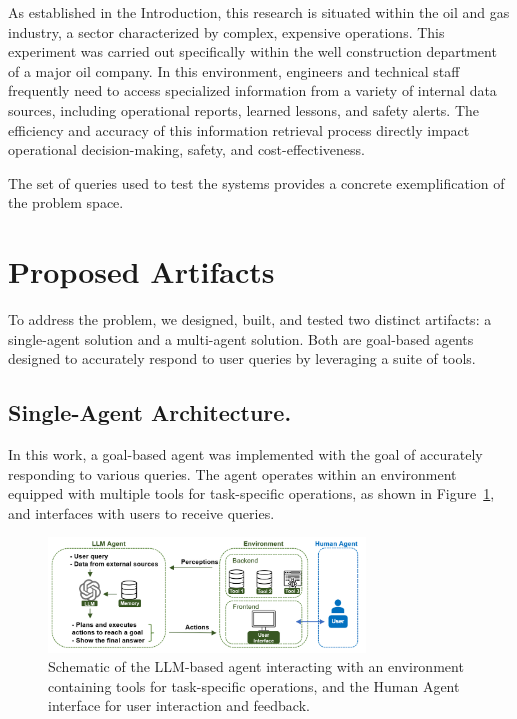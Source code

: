             As established in the Introduction, this research is situated within the oil and gas industry, a sector characterized by complex, expensive operations. This experiment was carried out specifically within the well construction department of a major oil company. In this environment, engineers and technical staff frequently need to access specialized information from a variety of internal data sources, including operational reports, learned lessons, and safety alerts. The efficiency and accuracy of this information retrieval process directly impact operational decision-making, safety, and cost-effectiveness.

            The set of queries used to test the systems
            provides a concrete exemplification of the problem space.

    \section{Proposed Artifacts}

            To address the problem, we designed, built, and tested two distinct artifacts: a single-agent solution and a multi-agent solution. Both are goal-based agents designed to accurately respond to user queries by leveraging a suite of tools.

        \subsection{Single-Agent Architecture.}

            In this work, a goal-based agent \citep{Russell2020} was implemented with the goal of accurately responding to various queries. 
            The agent operates within an environment equipped with multiple tools for task-specific operations, as shown in Figure~\ref{fig:agent_environment}, and interfaces with users to receive queries.
            
            \begin{figure}[h]
                \centering
                \includegraphics[width=0.75\textwidth]{images/agent_environment_4.png}
                \caption{Schematic of the LLM-based agent interacting with an environment containing tools for task-specific operations, and the Human Agent interface for user interaction and feedback.}
                \label{fig:agent_environment}
            \end{figure}           
            
